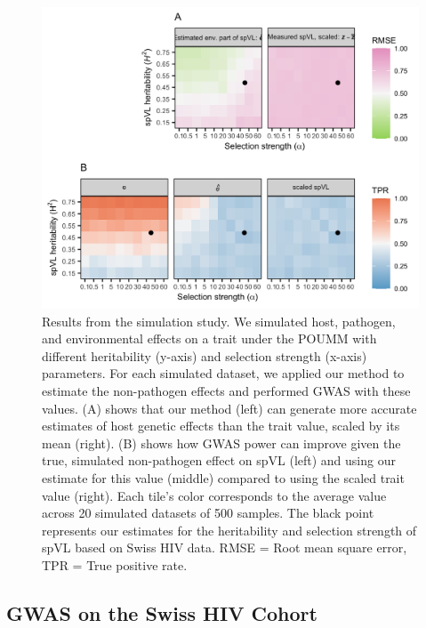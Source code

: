 \documentclass[]{article}
\begin{document}
\begin{doublespace}
\begin{figure}[H]
	\begin{center}
		\includegraphics[width=0.75\linewidth]{figures/simulation_results}
		\caption{Results from the simulation study. We simulated host, pathogen, and environmental effects on a trait under the POUMM with different heritability (y-axis) and selection strength (x-axis) parameters. For each simulated dataset, we applied our method to estimate the non-pathogen effects and performed GWAS with these values. (A) shows that our method (left) can generate more accurate estimates of host genetic effects than the trait value, scaled by its mean (right). (B) shows how GWAS power can improve given the true, simulated non-pathogen effect on spVL (left) and using our estimate for this value (middle) compared to using the scaled trait value (right). Each tile's color corresponds to the average value across 20 simulated datasets of 500 samples. The black point represents our estimates for the heritability and selection strength of spVL based on Swiss HIV data. RMSE = Root mean square error, TPR = True positive rate.}
		\label{fig:simulationResults}
	\end{center}
\end{figure}

\subsection{GWAS on the Swiss HIV Cohort}


\end{doublespace}
\end{document}
